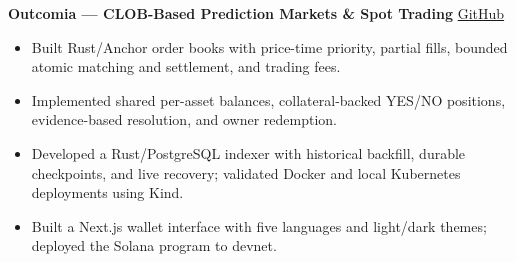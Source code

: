 \textbf{Outcomia --- CLOB-Based Prediction Markets \& Spot Trading}
\hfill
\href{https://github.com/kunal171/outcomia}{GitHub}

\begin{itemize}
  \item Built Rust/Anchor order books with price-time priority,
        partial fills, bounded atomic matching and settlement, and trading fees.
  \item Implemented shared per-asset balances, collateral-backed YES/NO
        positions, evidence-based resolution, and owner redemption.
  \item Developed a Rust/PostgreSQL indexer with historical backfill,
        durable checkpoints, and live recovery; validated Docker and
        local Kubernetes deployments using Kind.
  \item Built a Next.js wallet interface with five languages and
        light/dark themes; deployed the Solana program to devnet.
\end{itemize}
